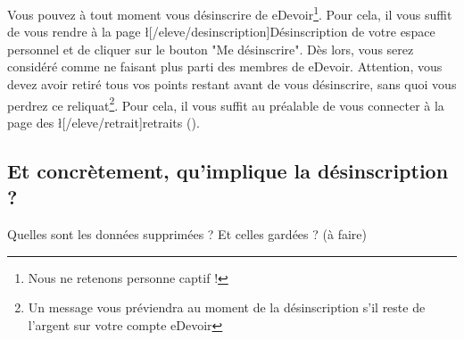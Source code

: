 ﻿Vous pouvez à tout moment vous désinscrire de eDevoir\footnote{Nous ne retenons personne captif !}. Pour cela, il vous suffit de vous rendre à la page \l[/eleve/desinscription]{Désinscription} de votre espace personnel et de cliquer sur le bouton "Me désinscrire". Dès lors, vous serez considéré comme ne faisant plus parti des membres de eDevoir. Attention, vous devez avoir retiré tous vos points restant avant de vous désinscrire, sans quoi vous perdrez ce reliquat\footnote{Un message vous préviendra au moment de la désinscription s'il reste de l'argent sur votre compte eDevoir}. Pour cela, il vous suffit au préalable de vous connecter à la page des \l[/eleve/retrait]{retraits} ().

\subsection{Et concrètement, qu'implique la désinscription ?}
Quelles sont les données supprimées ? Et celles gardées ? (à faire)